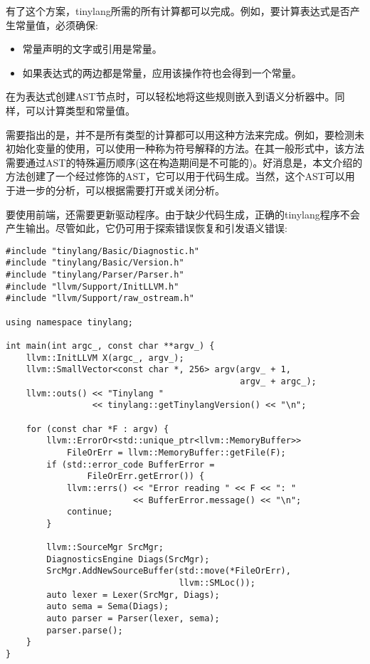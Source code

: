 有了这个方案，tinylang所需的所有计算都可以完成。例如，要计算表达式是否产生常量值，必须确保:\par

\begin{itemize}
	\item 常量声明的文字或引用是常量。
	\item 如果表达式的两边都是常量，应用该操作符也会得到一个常量。
\end{itemize}

在为表达式创建AST节点时，可以轻松地将这些规则嵌入到语义分析器中。同样，可以计算类型和常量值。\par

需要指出的是，并不是所有类型的计算都可以用这种方法来完成。例如，要检测未初始化变量的使用，可以使用一种称为符号解释的方法。在其一般形式中，该方法需要通过AST的特殊遍历顺序(这在构造期间是不可能的)。好消息是，本文介绍的方法创建了一个经过修饰的AST，它可以用于代码生成。当然，这个AST可以用于进一步的分析，可以根据需要打开或关闭分析。\par

要使用前端，还需要更新驱动程序。由于缺少代码生成，正确的tinylang程序不会产生输出。尽管如此，它仍可用于探索错误恢复和引发语义错误:\par

\begin{lstlisting}[caption={}]
#include "tinylang/Basic/Diagnostic.h"
#include "tinylang/Basic/Version.h"
#include "tinylang/Parser/Parser.h"
#include "llvm/Support/InitLLVM.h"
#include "llvm/Support/raw_ostream.h"

using namespace tinylang;

int main(int argc_, const char **argv_) {
	llvm::InitLLVM X(argc_, argv_);
	llvm::SmallVector<const char *, 256> argv(argv_ + 1,
											  argv_ + argc_);
	llvm::outs() << "Tinylang "
	 			 << tinylang::getTinylangVersion() << "\n";
	 			 
	for (const char *F : argv) {
		llvm::ErrorOr<std::unique_ptr<llvm::MemoryBuffer>>
			FileOrErr = llvm::MemoryBuffer::getFile(F);
		if (std::error_code BufferError =
				FileOrErr.getError()) {
			llvm::errs() << "Error reading " << F << ": "
						 << BufferError.message() << "\n";
			continue;
		}
	
		llvm::SourceMgr SrcMgr;
		DiagnosticsEngine Diags(SrcMgr);
		SrcMgr.AddNewSourceBuffer(std::move(*FileOrErr),
								  llvm::SMLoc());
		auto lexer = Lexer(SrcMgr, Diags);
		auto sema = Sema(Diags);
		auto parser = Parser(lexer, sema);
		parser.parse();
	}
}
\end{lstlisting}

